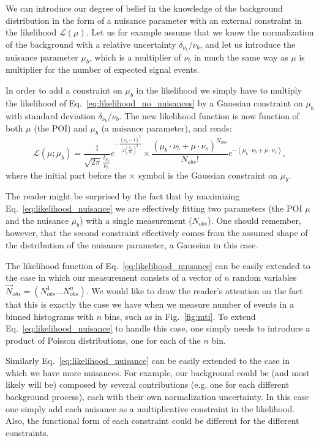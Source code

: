 \documentclass[a4paper,12pt]{article}
\begin{document}
We can introduce our degree of belief in the knowledge of the background
distribution in the form of a nuisance parameter with an external constraint
in the likelihood $\mathcal{L}(\mu)$. Let us for example assume that we know
the normalization of the background with a relative uncertainty
$\delta_{\nu_b}/\nu_b$, and let us introduce the nuisance parameter $\mu_b$,
which is a multiplier of $\nu_b$ in much the same way as $\mu$ is multiplier for the
number of expected signal events. 

In order to add a constraint on $\mu_b$ in the likelihood we simply have to
multiply the likelihood of Eq.~\ref{eq:likelihood_no_nuisances} by a Gaussian
constraint on $\mu_b$ with standard deviation $\delta_{\nu_b}/\nu_b$. The new
likelihood function is now function of both $\mu$ (the POI) and $\mu_b$ (a
nuisance parameter), and reads:
\begin{equation}
\mathcal{L}(\mu;\mu_b)=\frac{1}{\sqrt{2\pi}\frac{\delta_{\nu_b}}{\nu_b}}e^{-\frac{(\mu_b-1)^2}{2(\frac{\delta_{\nu_b}}{\nu_b})^2}}\times\frac{(\mu_b\cdot\nu_b+\mu\cdot\nu_s)^{N_{obs}}}{N_{obs}!}e^{-(\mu_b\cdot\nu_b+\mu\cdot\nu_s)},
\label{eq:likelihood_nuisance}
\end{equation}
where the initial part before the $\times$ symbol is the Gaussian constraint
on $\mu_b$.

The reader might be surprised by the fact that by maximizing
Eq.~\ref{eq:likelihood_nuisance} we are effectively fitting two parameters
(the POI $\mu$ and the nuisance $\mu_b$) with a single measurement
($N_{obs}$). One should remember, however, that the second constraint effectively comes from the assumed shape of
the distribution of the nuisance parameter, a Gaussian in this case.

The likelihood function of Eq.~\ref{eq:likelihood_nuisance} can be easily
extended to the case in which our measurement consists of a vector of
$n$ random variables $\vec{N}_{obs}=(N_{obs}^1...N_{obs}^n)$. We would like to draw the
reader's attention on the fact that this is exactly the case we have when we measure number
of events in a binned histograms with $n$ bins, such as in
Fig.~\ref{fig:mti}. To extend Eq.~\ref{eq:likelihood_nuisance} to handle this
case, one simply needs to introduce a product of Poisson distributions, one
for each of the $n$ bin. 

Similarly Eq.~\ref{eq:likelihood_nuisance} can be easily
extended to the case in which we have more nuisances. For example, our
background could be (and most likely will be) composed by several contributions (e.g. one for each different
background process), each with their own normalization uncertainty. In this case one simply add each nuisance as a
multiplicative constraint in the likelihood. Also, the functional form of each constraint could
be different for the different constraints.
\end{document}
